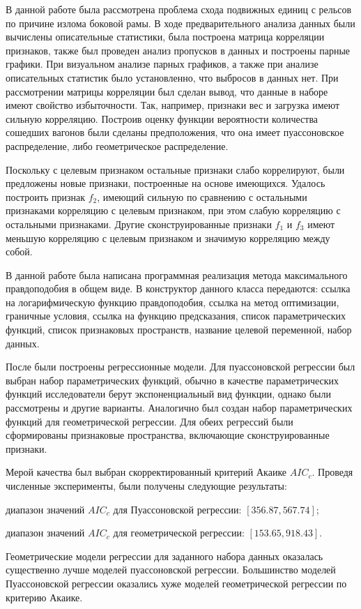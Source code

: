 В данной работе была рассмотрена проблема схода подвижных единиц с рельсов по причине излома боковой рамы. В ходе предварительного анализа данных были вычислены описательные статистики, была построена матрица корреляции признаков, также был проведен анализ пропусков в данных и построены парные графики. При визуальном анализе парных графиков, а также при анализе описательных статистик было установленно, что выбросов в данных нет. При рассмотрении матрицы корреляции был сделан вывод, что данные в наборе имеют свойство избыточности. Так, например, признаки вес и загрузка имеют сильную корреляцию. Построив оценку функции вероятности количества сошедших вагонов были сделаны предположения, что она имеет пуассоновское распределение, либо геометрическое распределение.

Поскольку с целевым признаком остальные признаки слабо коррелируют, были предложены новые признаки, построенные на основе имеющихся. Удалось построить признак $f_2$, имеющий сильную по сравнению с остальными признаками корреляцию с целевым признаком, при этом слабую корреляцию с остальными признаками. Другие сконструированные признаки $f_1$ и $f_3$ имеют меньшую корреляцию с целевым признаком и значимую корреляцию между собой.

В данной работе была написана программная реализация метода максимального правдоподобия в общем виде. В конструктор данного класса передаются: ссылка на логарифмическую функцию правдоподобия, ссылка на метод оптимизации, граничные условия, ссылка на функцию предсказания, список параметрических функций, список признаковых пространств, название целевой переменной, набор данных.

После были построены регрессионные модели. Для пуассоновской регрессии был выбран набор параметрических функций, обычно в качестве параметрических функций исследователи берут экспоненциальный вид функции, однако были рассмотрены и другие варианты. Аналогично был создан набор параметрических функций для геометрической регрессии. Для обеих регрессий были сформированы признаковые пространства, включающие сконструированные признаки.

Мерой качества был выбран скорректированный критерий Акаике $AIC_c$. Проведя численные эксперименты, были получены следующие результаты:
\begin{description}[font=$\bullet$]
    \item диапазон значений $AIC_c$ для Пуассоновской регрессии:  $[356.87, 567.74]$;
    \item диапазон значений $AIC_c$ для геометрической регрессии: $[153.65, 918.43]$.
\end{description}
Геометрические модели регрессии для заданного набора данных оказалась существенно лучше моделей пуассоновской регрессии. Большинство моделей Пуассоновской регрессии оказались хуже моделей геометрической регрессии по критерию Акаике.